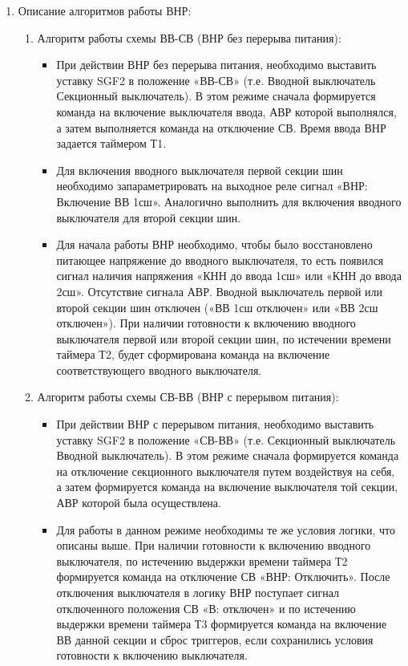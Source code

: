 \begin{enumerate}
\item
Описание алгоритмов работы ВНР:
\begin{enumerate}[label=\arabic*), noitemsep]
    \item Алгоритм работы схемы ВВ-СВ (ВНР без перерыва питания):
    \begin{itemize}
        \item При действии ВНР без перерыва питания, необходимо выставить уставку SGF2 в положение «ВВ-СВ» (т.е. Вводной выключатель \rightarrow  Секционный выключатель). В этом режиме сначала формируется команда на включение выключателя ввода, АВР которой выполнялся, а затем выполняется команда на отключение СВ. Время ввода ВНР задается таймером Т1. 
        \item Для включения вводного выключателя первой секции шин необходимо запараметрировать на выходное реле сигнал «ВНР: Включение ВВ 1сш». Аналогично выполнить для включения вводного выключателя для второй секции шин.  
        \item Для начала работы ВНР необходимо, чтобы было восстановлено питающее напряжение до вводного выключателя, то есть появился сигнал наличия напряжения «КНН до ввода 1сш» или «КНН до ввода 2сш». Отсутствие сигнала АВР. Вводной выключатель первой или второй секции шин отключен («ВВ 1сш отключен» или «ВВ 2сш  отключен»). При  наличии  готовности  к  включению  вводного выключателя первой или второй секции шин, по истечении времени таймера Т2, будет сформирована команда на включение соответствующего вводного выключателя.
        
    \end{itemize}
    \item Алгоритм работы схемы СВ-ВВ (ВНР с перерывом питания):
    \begin{itemize}
        \item При действии ВНР с перерывом питания, необходимо выставить уставку SGF2 в положение «СВ-ВВ» (т.е. Секционный выключатель \rightarrow Вводной выключатель). В этом режиме сначала формируется команда на отключение секционного выключателя путем воздействуя на себя, а затем формируется команда  на включение  выключателя  той  секции,  АВР  которой  была  осуществлена. 
        \item Для работы в данном режиме необходимы те же условия логики, что описаны выше. При наличии готовности к включению вводного выключателя, по истечению выдержки времени таймера Т2 формируется команда на отключение СВ «ВНР: Отключить». После отключения выключателя в логику ВНР поступает сигнал  отключенного  положения  СВ  «В:  отключен»  и  по  истечению  выдержки  времени  таймера  Т3 формируется  команда  на  включение  ВВ  данной  секции  и  сброс  триггеров,  если  сохранились  условия готовности к включению выключателя.
    \end{itemize}
\end{enumerate}


\end{enumerate}
